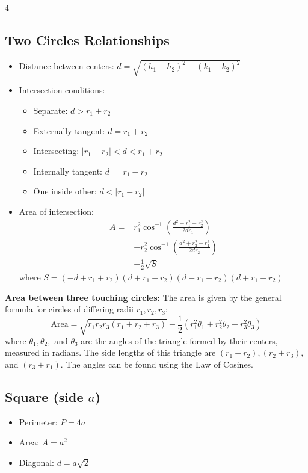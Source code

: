 \begin{multicols*}{4}
\subsection*{Two Circles Relationships}
\begin{itemize}
    \item Distance between centers: $d = \sqrt{(h_1 - h_2)^2 + (k_1 - k_2)^2}$
    \item Intersection conditions:
        \begin{itemize}
            \item Separate: $d > r_1 + r_2$
            \item Externally tangent: $d = r_1 + r_2$
            \item Intersecting: $|r_1 - r_2| < d < r_1 + r_2$
            \item Internally tangent: $d = |r_1 - r_2|$
            \item One inside other: $d < |r_1 - r_2|$
        \end{itemize}
    \item Area of intersection:
\[
\begin{split}
A = & r_1^2 \cos^{-1}\left(\frac{d^2 + r_1^2 - r_2^2}{2dr_1}\right) \\
& + r_2^2 \cos^{-1}\left(\frac{d^2 + r_2^2 - r_1^2}{2dr_2}\right) \\
& - \frac{1}{2}\sqrt{S}
\end{split}
\]
where $S = (-d + r_1 + r_2)(d + r_1 - r_2)(d - r_1 + r_2)(d + r_1 + r_2)$
\end{itemize}

\textbf{Area between three touching circles:}
The area is given by the general formula for circles of differing radii $r_1, r_2, r_3$:
\[
\text{Area} = \sqrt{r_1 r_2 r_3 (r_1 + r_2 + r_3)} - \frac{1}{2} \left( r_1^2 \theta_1 + r_2^2 \theta_2 + r_3^2 \theta_3 \right)
\]
where $\theta_1, \theta_2,$ and $\theta_3$ are the angles of the triangle formed by their centers, measured in radians. The side lengths of this triangle are $(r_1 + r_2), (r_2 + r_3),$ and $(r_3 + r_1)$. The angles can be found using the Law of Cosines.\newline

\subsection*{Square (side $a$)}
\begin{itemize}
    \item Perimeter: $P = 4a$
    \item Area: $A = a^2$
    \item Diagonal: $d = a\sqrt{2}$
\end{itemize}


\end{multicols*}
